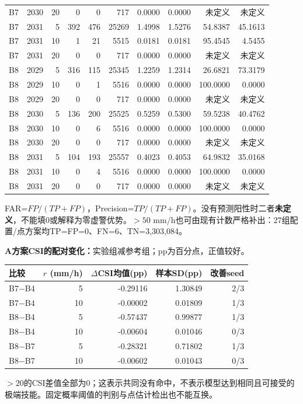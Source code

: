 \documentclass[UTF8,a4paper,10pt,fontset=none]{ctexart}
\begin{document}
\begin{center}
\begin{tabular}{@{}lrrrrrrrrr@{}}
B7 & 2030 & 20 & 0 & 0 & 717 & 0.0000 & 0.0000 & 未定义 & 未定义 \\
B7 & 2031 & 5 & 392 & 476 & 25269 & 1.4998 & 1.5276 & 54.8387 & 45.1613 \\
B7 & 2031 & 10 & 1 & 21 & 5515 & 0.0181 & 0.0181 & 95.4545 & 4.5455 \\
B7 & 2031 & 20 & 0 & 0 & 717 & 0.0000 & 0.0000 & 未定义 & 未定义 \\
B8 & 2029 & 5 & 316 & 115 & 25345 & 1.2259 & 1.2314 & 26.6821 & 73.3179 \\
B8 & 2029 & 10 & 0 & 1 & 5516 & 0.0000 & 0.0000 & 100.0000 & 0.0000 \\
B8 & 2029 & 20 & 0 & 0 & 717 & 0.0000 & 0.0000 & 未定义 & 未定义 \\
B8 & 2030 & 5 & 136 & 200 & 25525 & 0.5259 & 0.5300 & 59.5238 & 40.4762 \\
B8 & 2030 & 10 & 0 & 6 & 5516 & 0.0000 & 0.0000 & 100.0000 & 0.0000 \\
B8 & 2030 & 20 & 0 & 0 & 717 & 0.0000 & 0.0000 & 未定义 & 未定义 \\
B8 & 2031 & 5 & 104 & 193 & 25557 & 0.4023 & 0.4053 & 64.9832 & 35.0168 \\
B8 & 2031 & 10 & 0 & 4 & 5516 & 0.0000 & 0.0000 & 100.0000 & 0.0000 \\
B8 & 2031 & 20 & 0 & 0 & 717 & 0.0000 & 0.0000 & 未定义 & 未定义 \\
\bottomrule
\end{tabular}
\end{center}
FAR=$FP/(TP+FP)$，Precision=$TP/(TP+FP)$。没有预测阳性时二者\textbf{未定义}，不能填0或解释为零虚警优势。$>50$ mm/h也可由现有计数严格补出：27组配置/点方案均TP=FP=0、FN=6、TN=3,303,084。

\textbf{A方案CSI的配对变化：}实验组减参考组；pp为百分点，正值较好。
\begin{center}
\small
\begin{tabular}{@{}lrrrr@{}}
\toprule
比较 & $r$ (mm/h) & $\Delta$CSI均值(pp) & 样本SD(pp) & 改善seed \\
\midrule
B7$-$B4 & 5 & -0.29116 & 1.30849 & 2/3 \\
B7$-$B4 & 10 & -0.00002 & 0.01809 & 1/3 \\
B8$-$B4 & 5 & -0.57437 & 0.99877 & 1/3 \\
B8$-$B4 & 10 & -0.00604 & 0.01046 & 0/3 \\
B8$-$B7 & 5 & -0.28321 & 0.71802 & 1/3 \\
B8$-$B7 & 10 & -0.00602 & 0.01043 & 0/3 \\
\bottomrule
\end{tabular}
\end{center}
$>20$的CSI差值全部为0；这表示共同没有命中，不表示模型达到相同且可接受的极端技能。固定概率阈值的判别与点估计检出也不能互换。
\newpage
\end{document}
